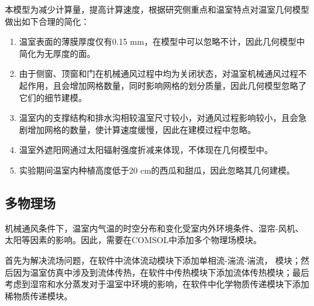 本模型为减少计算量，提高计算速度，根据研究侧重点和温室特点对温室几何模型做出如下合理的简化：
	\begin{enumerate}
		\item 温室表面的薄膜厚度仅有0.15 mm，在模型中可以忽略不计，因此几何模型中简化为无厚度的面。
		\item 由于侧窗、顶窗和门在机械通风过程中均为关闭状态，对温室机械通风过程不起作用，且会增加网格数量，同时影响网格的划分质量，因此几何模型忽略了它们的细节建模。
		\item 温室内的支撑结构和排水沟相较温室尺寸较小，对通风过程影响较小，且会急剧增加网格的数量，使计算速度缓慢，因此在建模过程中忽略。
		\item 温室外遮阳网通过太阳辐射强度折减来体现，不体现在几何模型中。
		\item 实验期间温室内种植高度低于20 cm的西瓜和甜瓜，因此忽略其几何建模。
	\end{enumerate}
	
	\subsection{多物理场}
	机械通风条件下，温室内气温的时空分布和变化受室内外环境条件、湿帘-风机、太阳等因素的影响。因此，需要在COMSOL中添加多个物理场模块。
	
首先为解决流场问题，在软件中流体流动模块下添加单相流-湍流-湍流， 模块；然后因为温室仿真中涉及到流体传热，在软件中传热模块下添加流体传热模块；最后考虑到湿帘和水分蒸发对于温室中环境的影响，在软件中化学物质传递模块下添加稀物质传递模块。

